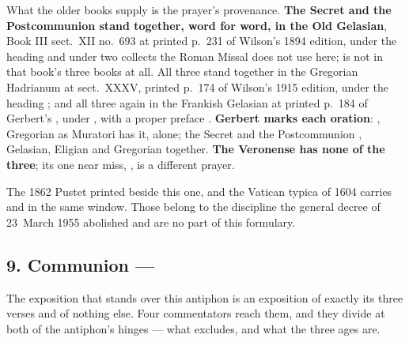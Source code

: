 What the older books supply is the prayer's provenance. \textbf{The Secret
and the Postcommunion stand together, word for word, in the Old Gelasian}, Book
III sect.~XII no.~693 at printed p.~231 of Wilson's 1894 edition, under the
heading  and under two collects the Roman Missal does not
use here;  is not in that book's three books at all. All three
stand together in the Gregorian Hadrianum at sect.~XXXV, printed p.~174 of
Wilson's 1915 edition, under the heading ; and all three again in the Frankish Gelasian at printed p.~184 of
Gerbert's , under , with a proper preface . \textbf{Gerbert marks
each oration}:  , Gregorian as Muratori has it, alone;
the Secret and the Postcommunion , Gelasian, Eligian and
Gregorian together. \textbf{The Veronense has none of the three}; its one near
miss, , is a different
prayer.

The 1862 Pustet printed  beside this one, and the Vatican
typica of 1604 carries  and  in the
same window. Those belong to the discipline the general decree of 23~March 1955
abolished and are no part of this formulary.

\subsection*{9. Communion  --- }

The exposition that stands over this antiphon is an exposition of exactly its
three verses and of nothing else. Four commentators reach them, and they divide
at both of the antiphon's hinges --- what  excludes, and what the
three ages are.

